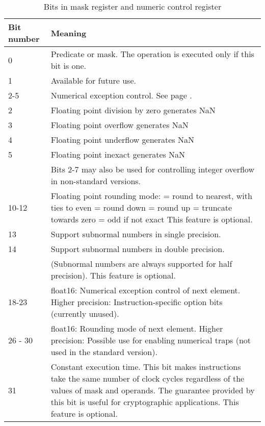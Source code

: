 \documentclass[forwardcom.tex]{subfiles}
\begin{document}
\begin{longtable}
{|p{15mm}|p{90mm}|}
\caption{Bits in mask register and numeric control register}
\label{table:maskBits}
\endfirsthead
\endhead
\hline
\bfseries Bit number & \bfseries Meaning \\
 \hline
0 & Predicate or mask. The operation is executed only if this bit is one.\\
1 & Available for future use. \\
\hline
2-5 & Numerical exception control. See page \pageref{table:FPErrorTypes}. \\
2 & Floating point division by zero generates NaN \\
3 & Floating point overflow generates NaN \\
4 & Floating point underflow generates NaN \\
5 & Floating point inexact generates NaN \\
  & Bits 2-7 may also be used for controlling integer overflow in non-standard versions.\\ \hline
10-12 & Floating point rounding mode: \newline
000 = round to nearest, with ties to even \newline
001 = round down \newline
010 = round up \newline
011 = truncate towards zero \newline
100 = odd if not exact \newline
This feature is optional.\\ \hline
13 & Support subnormal numbers in single precision. \\
14 & Support subnormal numbers in double precision. \\
 &  (Subnormal numbers are always supported for half precision). This feature is optional.\\ \hline  
18-23 & float16: Numerical exception control of next element. \newline
        Higher precision: Instruction-specific option bits (currently unused). \\
\hline
26 - 30 & float16: Rounding mode of next element. \newline
        Higher precision: Possible use for enabling numerical traps (not used in the standard version). \\
\hline
31 & Constant execution time. This bit makes instructions take the same number of clock cycles regardless of the values of mask and operands. The guarantee provided by this bit is useful for cryptographic applications. This feature is optional. \\
\hline
\end{longtable}
\end{document}
